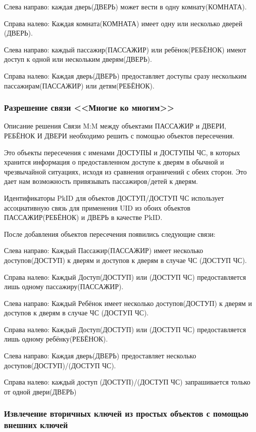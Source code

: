 Слева направо: каждая дверь(ДВЕРЬ) может вести в одну комнату(КОМНАТА).

Справа налево: Каждая комната(КОМНАТА) имеет одну или несколько дверей (ДВЕРЬ).

Слева направо: каждый пассажир(ПАССАЖИР) или ребёнок(РЕБЁНОК) имеют доступ к одной или нескольким дверям(ДВЕРЬ).

Справа налево: Каждая дверь(ДВЕРЬ) предоставляет доступы сразу нескольким пассажирам(ПАССАЖИР) или детям(РЕБЁНОК).

\subsubsection{Разрешение связи <<Многие ко многим>>}

Описание решения Связи M:M между объектами ПАССАЖИР и ДВЕРИ, РЕБЁНОК И ДВЕРИ необходимо решить с помощью объектов пересечения. 

Это объекты пересечения с именами ДОСТУПЫ и ДОСТУПЫ ЧС, в которых хранится информация о предоставленном доступе к дверям в обычной и чрезвычайной ситуациях, исходя из сравнения ограничений с обеих сторон. Это дает нам возможность привязывать пассажиров/детей к дверям.
 
Идентификаторы PkID для объектов ДОСТУП/ДОСТУП ЧС использует ассоциативную связь для применения UID из обоих объектов ПАССАЖИР(РЕБЁНОК) и ДВЕРЬ в качестве PkID.

После добавления объектов пересечения появились следующие связи:

Слева направо: Каждый Пассажир(ПАССАЖИР) имеет несколько доступов(ДОСТУП) к дверям и доступов к дверям в случае ЧС (ДОСТУП ЧС).

Справа налево: Каждый Доступ(ДОСТУП) или (ДОСТУП ЧС) предоставляется лишь одному пассажиру(ПАССАЖИР).

Слева направо: Каждый Ребёнок имеет несколько доступов(ДОСТУП) к дверям и доступов к дверям в случае ЧС (ДОСТУП ЧС).

Справа налево: Каждый Доступ(ДОСТУП) или (ДОСТУП ЧС) предоставляется лишь одному ребёнку(РЕБЁНОК).

Слева направо: Каждая дверь(ДВЕРЬ) предоставляет несколько доступов(ДОСТУП)/(ДОСТУП ЧС).

Справа налево: каждый доступ (ДОСТУП)/(ДОСТУП ЧС) запрашивается только от одной двери(ДВЕРЬ)

\subsubsection{Извлечение вторичных ключей из простых объектов с помощью внешних ключей}

